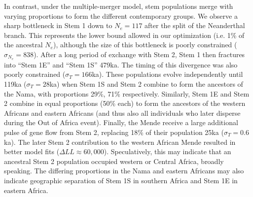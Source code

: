 \documentclass[]{article}
\begin{document}
In contrast, under the multiple-merger model, stem populations merge with
varying proportions to form the different contemporary groups. 
We observe a sharp bottleneck in Stem 1 down to $N_e=117$ after the split of
the Neanderthal branch. This represents the lower bound allowed in our
optimization (i.e. 1\% of the ancestral $N_e$), although the size of this
bottleneck is poorly constrained ($\sigma_{N_e}=838$). After a long period of
exchange with Stem 2, Stem 1 then fractures into ``Stem 1E'' and ``Stem 1S''
479ka. The timing of this divergence was also poorly constrained ($\sigma_T=
166$ka). These populations evolve independently until 119ka
($\sigma_T=
28$ka) when Stem 1S and Stem 2 combine to form the ancestors of the Nama, with
proportions 29\%, 71\% respectively. Similarly, Stem 1E and Stem 2 combine in
equal proportions (50\% each) to form the ancestors of the western Africans and
eastern Africans (and thus also all individuals who later disperse during the
Out of Africa event). Finally, the Mende receive a large additional pulse of
gene flow from Stem 2, replacing 18\% of their population 25ka ($\sigma_T=
0.6$ka).
The later Stem 2 contribution to the western African Mende resulted in
better model fits ($\Delta LL \approx 60,000$).
Speculatively, this may indicate that an ancestral Stem 2 population occupied western or
Central Africa, broadly speaking. The differing proportions in the Nama and
eastern Africans may also indicate geographic separation of Stem 1S in southern
Africa and Stem 1E in eastern Africa. 
\end{document}
